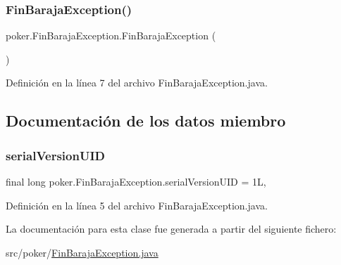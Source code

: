 \subsubsection{\texorpdfstring{FinBarajaException()}{FinBarajaException()}}
{\footnotesize\ttfamily poker.\+Fin\+Baraja\+Exception.\+Fin\+Baraja\+Exception (\begin{DoxyParamCaption}{ }\end{DoxyParamCaption})}



Definición en la línea 7 del archivo Fin\+Baraja\+Exception.\+java.


\begin{DoxyCode}{0}

\end{DoxyCode}


\subsection{Documentación de los datos miembro}
\mbox{\label{classpoker_1_1FinBarajaException_a14c66e988f7a450ae98d1c31235085ca}} 
\subsubsection{\texorpdfstring{serialVersionUID}{serialVersionUID}}
{\footnotesize\ttfamily final long poker.\+Fin\+Baraja\+Exception.\+serial\+Version\+U\+ID = 1L\hspace{0.3cm}{\ttfamily [static]}, {\ttfamily [private]}}



Definición en la línea 5 del archivo Fin\+Baraja\+Exception.\+java.



La documentación para esta clase fue generada a partir del siguiente fichero\+:\begin{DoxyCompactItemize}
\item 
src/poker/\mbox{\hyperlink{FinBarajaException_8java}{Fin\+Baraja\+Exception.\+java}}\end{DoxyCompactItemize}
